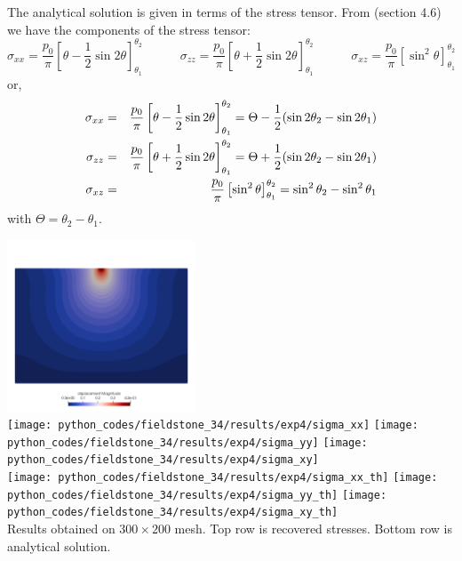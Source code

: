 The analytical solution is given in terms of the stress tensor.
From \textcite{dase96}(section 4.6) we have the components of the stress tensor:
\[
\sigma_{xx}=\frac{p_0}{\pi}\left[ \theta - \frac{1}{2}\sin 2\theta  \right]^{\theta_2}_{\theta_1}
\quad\quad\quad
\sigma_{zz}=\frac{p_0}{\pi}\left[ \theta + \frac{1}{2}\sin 2\theta  \right]^{\theta_2}_{\theta_1}
\quad\quad\quad
\sigma_{xz}=\frac{p_0}{\pi}\left[ \sin^2 \theta  \right]^{\theta_2}_{\theta_1}
\]
or, 
\begin{eqnarray}
{\sigma}_{xx}&=&\frac{p_0}{\pi}\left[ \theta - \frac{1}{2}\sin 2\theta  \right]^{\theta_2}_{\theta_1} = \Theta - \frac{1}{2} ( \sin 2\theta_2 - \sin 2\theta_1) \nonumber\\
{\sigma}_{zz}&=&\frac{p_0}{\pi}\left[ \theta + \frac{1}{2}\sin 2\theta  \right]^{\theta_2}_{\theta_1} = \Theta + \frac{1}{2} ( \sin 2\theta_2 - \sin 2\theta_1) \nonumber\\
{\sigma}_{xz}&=&\frac{p_0}{\pi}\left[ \sin^2 \theta  \right]^{\theta_2}_{\theta_1} =  \sin^2 \theta_2 - \sin^2 \theta_1 \nonumber
\end{eqnarray}
with $\Theta=\theta_2-\theta_1$. 

\newpage
\begin{center}
\includegraphics[width=5.6cm]{python_codes/fieldstone_34/results/exp4/disp}\\
\texttt{[image: python\_codes/fieldstone\_34/results/exp4/sigma\_xx]}
\texttt{[image: python\_codes/fieldstone\_34/results/exp4/sigma\_yy]}
\texttt{[image: python\_codes/fieldstone\_34/results/exp4/sigma\_xy]}\\
\texttt{[image: python\_codes/fieldstone\_34/results/exp4/sigma\_xx\_th]}
\texttt{[image: python\_codes/fieldstone\_34/results/exp4/sigma\_yy\_th]}
\texttt{[image: python\_codes/fieldstone\_34/results/exp4/sigma\_xy\_th]}\\
{\captionfont Results obtained on $300\times 200$ mesh. Top row is recovered stresses. 
Bottom row is analytical solution.}
\end{center}

